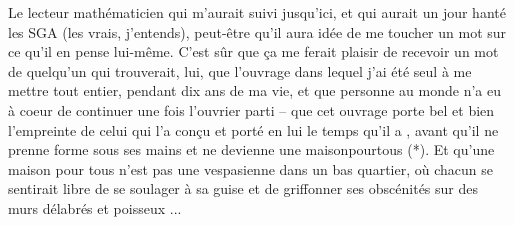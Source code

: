 Le lecteur mathématicien qui m'aurait suivi jusqu'ici, et qui aurait un jour hanté les SGA (les vrais, j'entends)\deleted{\unsure{*}}, peut-être qu'il aura idée de me toucher un mot sur ce qu'il en pense lui-même. C'est sûr que ça me ferait plaisir de recevoir un mot de quelqu'un qui trouverait, lui, que l'ouvrage dans lequel j'ai été seul à me mettre tout entier, pendant dix ans de ma vie, et que p\enspace e\enspace r\enspace s\enspace o\enspace n\enspace n\enspace e au monde n'a eu à coeur de continuer une fois l'ouvrier parti -- que cet ouvrage porte bel et bien l'empreinte de celui qui l'a conçu et porté en lui le temps qu'il a , avant qu'il ne prenne forme sous ses mains et ne devienne une m\enspace a\enspace i\enspace s\enspace o\enspace n\quad p\enspace o\enspace u\enspace r\quad t\enspace o\enspace u\enspace s (*). Et qu'une maison pour tous n'est pas une vespasienne dans un bas quartier, où chacun se sentirait libre de se soulager à sa guise et de griffonner ses obscénités sur des murs délabrés et poisseux ...


